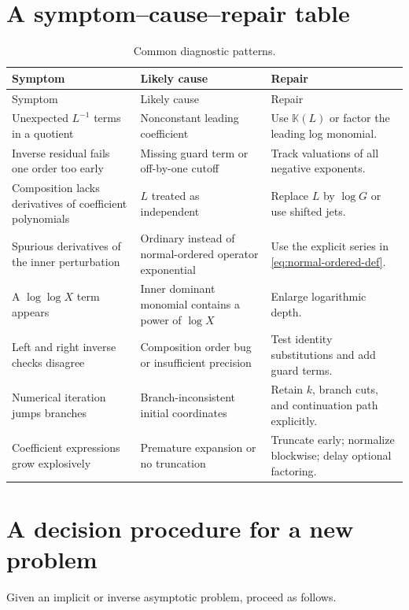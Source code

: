 \documentclass[11pt,openany]{book}
\theoremstyle{definition}
\theoremstyle{plain}
\theoremstyle{remark}
\newcommand{\K}{\mathbb{K}}
\begin{document}
\section{A symptom--cause--repair table}
\begin{longtable}{@{}p{}p{}p{}@{}}
\caption{Common diagnostic patterns.}\label{tab:diagnostics}\\
\toprule
Symptom & Likely cause & Repair \\
\midrule
\endfirsthead
\toprule
Symptom & Likely cause & Repair \\
\midrule
\endhead
Unexpected \(L^{-1}\) terms in a quotient & Nonconstant leading coefficient &
Use \(\K(L)\) or factor the leading log monomial. \\
\addlinespace
Inverse residual fails one order too early & Missing guard term or off-by-one
cutoff & Track valuations of all negative exponents. \\
\addlinespace
Composition lacks derivatives of coefficient polynomials & \(L\) treated as
independent & Replace \(L\) by \(\log G\) or use shifted jets. \\
\addlinespace
Spurious derivatives of the inner perturbation & Ordinary instead of
normal-ordered operator exponential & Use the explicit series in
\cref{eq:normal-ordered-def}. \\
\addlinespace
A \(\log\log X\) term appears & Inner dominant monomial contains a power of
\(\log X\) & Enlarge logarithmic depth. \\
\addlinespace
Left and right inverse checks disagree & Composition order bug or insufficient
precision & Test identity substitutions and add guard terms. \\
\addlinespace
Numerical iteration jumps branches & Branch-inconsistent initial coordinates &
Retain \(k\), branch cuts, and continuation path explicitly. \\
\addlinespace
Coefficient expressions grow explosively & Premature expansion or no
truncation & Truncate early; normalize blockwise; delay optional factoring. \\
\bottomrule
\end{longtable}

\section{A decision procedure for a new problem}
Given an implicit or inverse asymptotic problem, proceed as follows.
\end{document}
